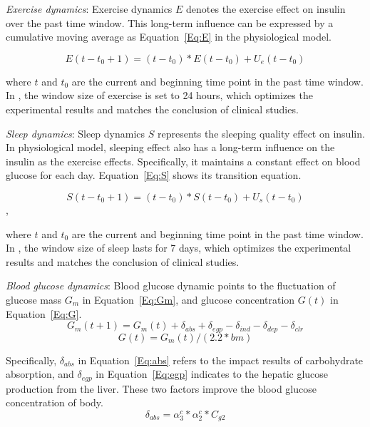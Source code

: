 \emph{Exercise dynamics}: Exercise dynamics $E$ denotes the exercise effect on insulin over the past time window. This 
long-term influence can be expressed by a cumulative moving average \cite{bib:lowry1992multivariate, bib:cma} as Equation~\ref{Eq:E} in the physiological model.

\begin{equation}\label{Eq:E}
E(t-t_0+1)=(t-t_0)*E(t-t_0)+U_{e}(t-t_0)
\end{equation}

where $t$ and $t_0$ are the current and beginning time point in the past time window. In \sysname,
the window size of exercise is set to 24 hours, which optimizes the experimental results and matches the conclusion
of clinical studies.

\emph{Sleep dynamics}: Sleep dynamics $S$ represents the sleeping quality effect on insulin. In physiological model, sleeping
effect also has a long-term influence on the insulin as the exercise effects. Specifically, it maintains a constant effect on 
blood glucose for each day. Equation~\ref{Eq:S} shows its transition equation.

\begin{equation}\label{Eq:S}
S(t-t_0+1)=(t-t_0)*S(t-t_0)+U_{s}(t-t_0)
\end{equation},

where $t$ and $t_0$ are the current and beginning time point in the past time window. 
In \sysname, the window size of sleep lasts for 7 days, which optimizes the experimental results and matches the conclusion
of clinical studies.


\emph{Blood glucose dynamics}: Blood glucose dynamic points to the fluctuation of glucose mass $G_m$  in Equation~\ref{Eq:Gm},
and glucose concentration $G(t)$ in Equation~\ref{Eq:G}.
\begin{equation}\label{Eq:Gm}
G_m(t+1)=G_m(t)+\delta_{abs}+\delta_{egp}-\delta_{ind}-\delta_{dep}-\delta_{clr}
\end{equation}
\begin{equation}\label{Eq:G}
G(t)=G_m(t)/(2.2*bm)
\end{equation}

Specifically, $\delta_{abs}$ in Equation~\ref{Eq:abs} refers to the impact results of carbohydrate absorption, and
$\delta_{egp}$ in Equation~\ref{Eq:egp} indicates to the hepatic glucose production from 
the liver. These two factors improve the blood glucose concentration of body.
\begin{equation}\label{Eq:abs}
  \delta_{abs}=\alpha_3^c*\alpha_2^c*C_{g2}
\end{equation}

